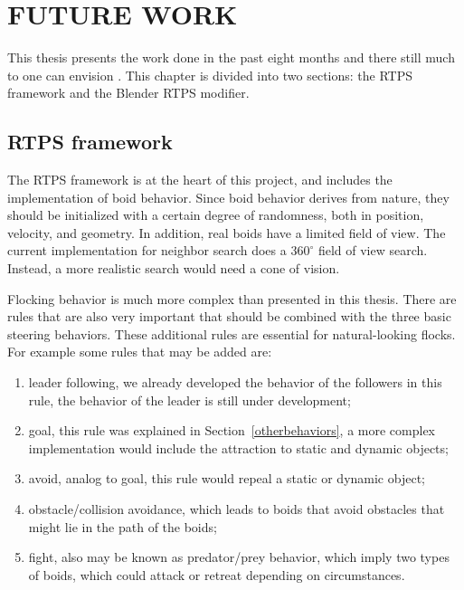 \chapter{FUTURE WORK}\label{chap8}

This thesis presents the work done in the past eight months and there still much to one can envision . This chapter is  divided into two sections: the RTPS framework and the Blender RTPS modifier.

\section{RTPS framework}

The RTPS framework is at the heart of this project, and includes the implementation of boid behavior. Since boid behavior derives from nature, they should be initialized with a certain degree of randomness, both in position, velocity, and geometry. 
In addition, real boids have a limited field of view. 
The current implementation for neighbor search does a $360^{\circ}$ field of view search. Instead, a more realistic search would need a cone of vision.

Flocking behavior is much more complex than presented in this thesis. There are rules that are also very important that should be combined with the three basic steering behaviors. These additional rules are essential for natural-looking flocks. For example some rules that may be added are: 

\begin{enumerate}
\item{leader following, we already developed the behavior of the followers in this rule, the behavior of the leader  is still under development;}
\item{goal, this rule was explained in Section~\ref{otherbehaviors}, a more complex implementation would include the attraction to static and dynamic objects;}
\item{avoid, analog to goal, this rule would repeal a static or dynamic object;} 
\item{obstacle/collision avoidance, which leads to boids that avoid obstacles that might lie in the path of the boids;}
\item{fight, also may be known as predator/prey behavior, which imply two types of boids, which could attack or retreat depending on circumstances.}
\end{enumerate}

